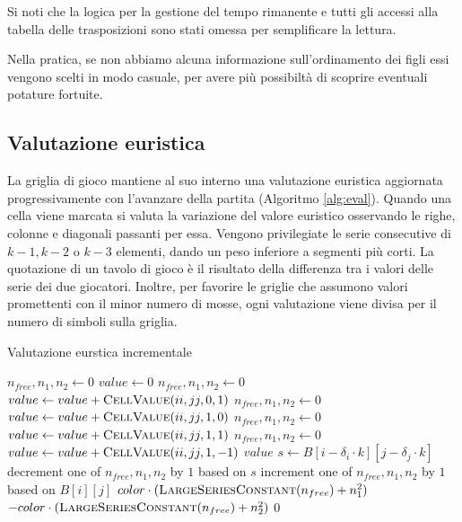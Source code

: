 \documentclass{article}
\begin{document}
Si noti che la logica per la gestione del tempo rimanente e tutti gli accessi
alla tabella delle trasposizioni sono stati omessa per semplificare la lettura.

Nella pratica, se non abbiamo alcuna informazione sull'ordinamento dei figli
essi vengono scelti in modo casuale, per avere pi\`u possibilt\`a di scoprire
eventuali potature fortuite.

\subsection{Valutazione euristica}

La griglia di gioco mantiene al suo interno una valutazione euristica 
aggiornata progressivamente con l'avanzare della partita (Algoritmo \vref{alg:eval}).
Quando una cella viene marcata si valuta la variazione del valore euristico osservando
le righe, colonne e diagonali passanti per essa. Vengono privilegiate le serie consecutive 
di $k-1, k-2$ o $k-3$ elementi, dando un peso inferiore a segmenti pi\`u corti.
La quotazione di un tavolo di gioco \`e il risultato della differenza tra i
valori delle serie dei due giocatori. Inoltre, per favorire le griglie che
assumono valori promettenti con il minor numero di mosse, ogni
valutazione viene divisa per il numero di simboli sulla griglia.

\begin{algorithm}[H]
  \caption{Valutazione eurstica incrementale}
  \label{alg:eval}
  \begin{algorithmic}[0]
    \State $n_{free}, n_1, n_2 \gets 0$
      \State $value \gets 0$
      \State $n_{free}, n_1, n_2 \gets 0$
        \State $value \gets value + \Call{CellValue}{ii, jj, 0, 1}$
      \EndFor
      \State $n_{free}, n_1, n_2 \gets 0$
        \State $value \gets value + \Call{CellValue}{ii, jj, 1, 0}$
      \EndFor
      \State $n_{free}, n_1, n_2 \gets 0$
        \State $value \gets value + \Call{CellValue}{ii, jj, 1, 1}$
      \EndFor
      \State $n_{free}, n_1, n_2 \gets 0$
        \State $value \gets value + \Call{CellValue}{ii, jj, 1, -1}$
      \EndFor
      \State \Return $value$
    \EndProcedure
       
        \State $s \gets B[i - \delta_i \cdot k][j - \delta_j \cdot k]$ 
        \State decrement one of $n_{free}, n_1, n_2$ by $1$ based on $s$
      \EndIf
      \State increment one of $n_{free}, n_1, n_2$ by $1$ based on $B[i][j]$
      \Statex
        \State \Return $color \cdot (\Call{LargeSeriesConstant}{n_{free}} + n_1^2)$
        \State \Return $-color \cdot (\Call{LargeSeriesConstant}{n_{free}} + n_2^2)$
      \Else
        \State \Return $0$
      \EndIf
    \EndProcedure
  \end{algorithmic}
\end{algorithm}
\end{document}
